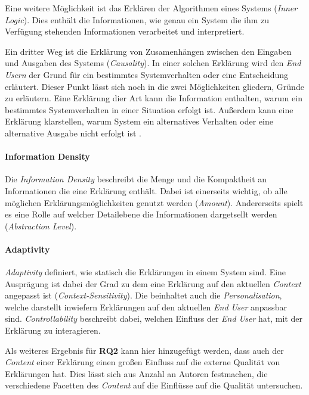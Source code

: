 Eine weitere Möglichkeit ist das Erklären der Algorithmen eines Systems (\textit{Inner Logic}). Dies enthält die Informationen, wie genau ein System die ihm zu Verfügung stehenden Informationen verarbeitet und interpretiert.

Ein dritter Weg ist die Erklärung von Zusamenhängen zwischen den Eingaben und Ausgaben des Systems (\textit{Causality}). In einer solchen Erklärung wird den \textit{End Usern} der Grund für ein bestimmtes Systemverhalten oder eine Entscheidung erläutert. Dieser Punkt lässt sich noch in die zwei Möglichkeiten gliedern, Gründe zu erläutern. Eine Erklärung dier Art kann die Information enthalten, warum ein bestimmtes Systemverhalten in einer Situation erfolgt ist. Außerdem kann eine Erklärung klarstellen, warum System ein alternatives Verhalten oder eine alternative Ausgabe nicht erfolgt ist \cite{martin_evaluating_2021}.


\paragraph{Information Density} Die \textit{Information Density} beschreibt die Menge und die Kompaktheit an Informationen die eine Erklärung enthält. Dabei ist einerseits wichtig, ob alle möglichen Erklärungsmöglichkeiten genutzt werden (\textit{Amount}). Andererseits spielt es eine Rolle auf welcher Detailebene die Informationen dargetsellt werden (\textit{Abstraction Level}).

\paragraph{Adaptivity} \textit{Adaptivity} definiert, wie statisch die Erklärungen in einem System sind. Eine Ausprägung ist dabei der Grad zu dem eine Erklärung auf den aktuellen \textit{Context} angepasst ist (\textit{Context-Sensitivity}). Die beinhaltet auch die \textit{Personalisation}, welche darstellt inwiefern Erklärungen auf den aktuellen \textit{End User} anpassbar sind. \textit{Controllability} beschreibt dabei, welchen Einfluss der \textit{End User} hat, mit der Erklärung zu interagieren.

\bigskip

Als weiteres Ergebnis für \textbf{RQ2} kann hier hinzugefügt werden, dass auch der \textit{Content} einer Erklärung einen großen Einfluss auf die externe Qualität von Erklärungen hat. Dies lässt sich aus Anzahl an Autoren festmachen, die verschiedene Facetten des \textit{Content} auf die Einflüsse auf die Qualität untersuchen.

